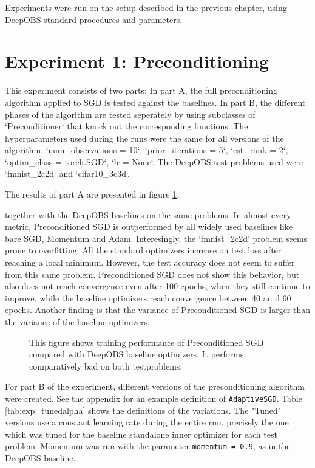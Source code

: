 \documentclass[twoside,12pt,a4paper]{report}
\begin{document}
Experiments were run on the setup described in the previous chapter, using DeepOBS standard procedures and parameters.

\section{Experiment 1: Preconditioning}
\begin{markdown}
This experiment consists of two parts: In part A, the full preconditioning algorithm applied to SGD is tested against the baselines.
In part B, the different phases of the algorithm are tested seperately by using subclasses of `Preconditioner` that knock out the corresponding functions.
The hyperparameters used during the runs were the same for all versions of the algorithm: `num_observations = 10`, `prior_iterations = 5`, `est_rank = 2`, `optim_class = torch.SGD`, `lr = None`. The DeepOBS test problems used were `fmnist_2c2d` and `cifar10_3c3d`.
\end{markdown}

The results of part A are presented in figure \ref{fig:exp_preconditioning},
\begin{markdown}
together with the DeepOBS baselines on the same problems. In almost every metric, Preconditioned SGD is outperformed by all widely used baselines like bare SGD, Momentum and Adam.
Interesingly, the `fmnist_2c2d` problem seems prone to overfitting: All the standard optimizers increase on test loss after reaching a local minimum. However, the test accuracy does not seem to suffer from this same problem.
Preconditioned SGD does not show this behavior, but also does not reach convergence even after 100 epochs, when they still continue to improve, while the baseline optimizers reach convergence between 40 an d 60 epochs.
Another finding is that the variance of Preconditioned SGD is larger than the variance of the baseline optimizers.

\end{markdown}
\begin{figure}
	
	\caption{This figure shows training performance of Preconditioned SGD\\
		 compared with DeepOBS baseline optimizers. It performs comparatively bad on both testproblems.}
	\label{fig:exp_preconditioning}
\end{figure}


For part B of the experiment, different versions of the preconditioning algorithm were created. See the appendix for an example definition of \verb|AdaptiveSGD|.
Table \ref{tab:exp_tunedalpha} shows the definitions of the variations. The "Tuned" versions use a constant learning rate during the entire run, precisely the one which was tuned for the baseline standalone inner optimizer for each test problem.
Momentum was run with the parameter \verb|momentum = 0.9|, as in the DeepOBS baseline.
\end{document}
